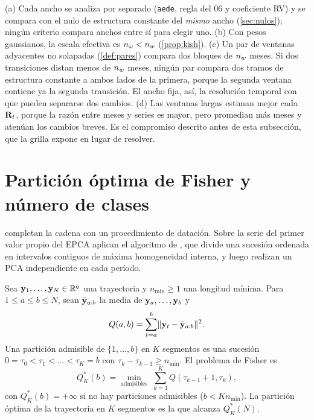\begin{observacion}\label{obs:multiescala}
(a) Cada ancho se analiza por separado (\texttt{aede}, regla del 06 y coeficiente RV) y se compara
con el nulo de estructura constante del \emph{mismo} ancho (\cref{sec:nulos}); ningún criterio
compara anchos entre sí para elegir uno. (b) Con pesos gaussianos, la escala efectiva es
$n_{\omega}<n_{w}$ (\cref{prop:kish}). (c) Un par de ventanas adyacentes no solapadas
(\cref{def:pares}) compara dos bloques de $n_{w}$ meses. Si dos transiciones distan menos de $n_{w}$
meses, ningún par compara dos tramos de estructura constante a ambos lados de la primera, porque
la segunda ventana contiene ya la segunda transición. El ancho fija, así, la resolución temporal
con que pueden separarse dos cambios. (d) Las ventanas largas estiman mejor cada $\mathbf{R}_t$, porque
la razón entre meses y series es mayor, pero promedian más meses y atenúan los cambios breves.
Es el compromiso descrito antes de esta subsección, que la grilla expone en lugar de resolver.
\end{observacion}

\section{Partición óptima de Fisher y número de clases}
\label{sec:fisher}

\textcite{camiz_roig_2011} completan la cadena con un procedimiento de datación. Sobre la serie del
primer valor propio del EPCA aplican el algoritmo de \textcite{fisher_1958}, que divide una
sucesión ordenada en intervalos contiguos de máxima homogeneidad interna, y luego realizan un PCA
independiente en cada período.

\begin{definicion}\label{def:fisher}
Sea $\mathbf{y}_1,\dots,\mathbf{y}_N\in\mathbb{R}^{q}$ una trayectoria y $n_{\min}\ge1$ una longitud mínima. Para
$1\le a\le b\le N$, sean $\bar{\mathbf{y}}_{a:b}$ la media de $\mathbf{y}_a,\dots,\mathbf{y}_b$ y
\[
  Q(a,b)=\sum_{t=a}^{b}\lVert \mathbf{y}_t-\bar{\mathbf{y}}_{a:b}\rVert^2 .
\]
Una partición admisible de $\{1,\dots,b\}$ en $K$ segmentos es una sucesión
$0=\tau_0<\tau_1<\dots<\tau_K=b$ con $\tau_k-\tau_{k-1}\ge n_{\min}$. El problema de Fisher es
\begin{equation}\label{eq:fisher}
  Q^\ast_K(b)=\min_{\text{admisibles}}\;\sum_{k=1}^{K}Q(\tau_{k-1}+1,\tau_k),
\end{equation}
con $Q^\ast_K(b)=+\infty$ si no hay particiones admisibles ($b<Kn_{\min}$). La partición óptima
de la trayectoria en $K$ segmentos es la que alcanza $Q^\ast_K(N)$.
\end{definicion}

